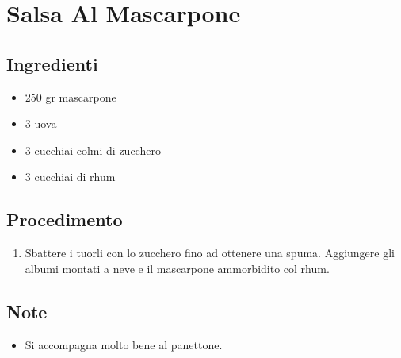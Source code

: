 \section{Salsa Al Mascarpone}
\subsection{Ingredienti}
\begin{itemize}
\item 250 gr mascarpone  
\item 3 uova  
\item 3 cucchiai colmi di zucchero  
\item 3 cucchiai di rhum
\end{itemize}
\subsection{Procedimento}
\begin{enumerate}
\item  Sbattere i tuorli con lo zucchero fino ad ottenere una spuma. Aggiungere gli albumi montati a neve e il mascarpone ammorbidito col rhum.
\end{enumerate}
\subsection{Note}
\begin{itemize}
\item Si accompagna molto bene al panettone.
\end{itemize}
